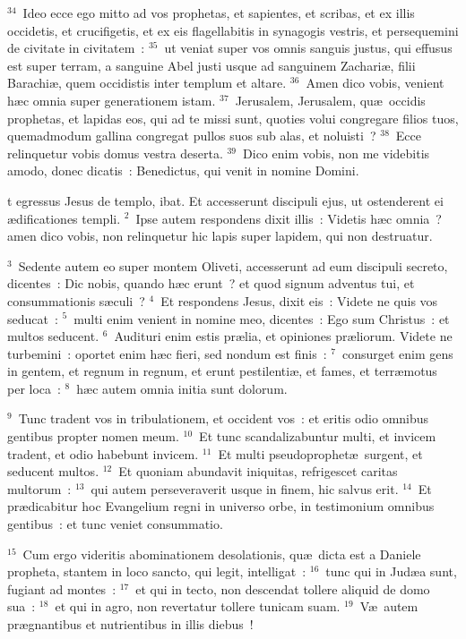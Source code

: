 ${}^{34}$~Ideo ecce ego mitto ad vos prophetas, et sapientes, et scribas, et ex illis occidetis, et crucifigetis, et ex eis flagellabitis in synagogis vestris, et persequemini de civitate in civitatem~:
${}^{35}$~ut veniat super vos omnis sanguis justus, qui effusus est super terram, a sanguine Abel justi usque ad sanguinem Zachari\ae , filii Barachi\ae , quem occidistis inter templum et altare.
${}^{36}$~Amen dico vobis, venient h\ae c omnia super generationem istam.
${}^{37}$~Jerusalem, Jerusalem, qu\ae\ occidis prophetas, et lapidas eos, qui ad te missi sunt, quoties volui congregare filios tuos, quemadmodum gallina congregat pullos suos sub alas, et noluisti~?
${}^{38}$~Ecce relinquetur vobis domus vestra deserta.
${}^{39}$~Dico enim vobis, non me videbitis amodo, donec dicatis~: Benedictus, qui venit in nomine Domini.

\bchapter
{}t egressus Jesus de templo, ibat. Et accesserunt discipuli ejus, ut ostenderent ei \ae dificationes templi.
${}^{2}$~Ipse autem respondens dixit illis~: Videtis h\ae c omnia~? amen dico vobis, non relinquetur hic lapis super lapidem, qui non destruatur.


${}^{3}$~Sedente autem eo super montem Oliveti, accesserunt ad eum discipuli secreto, dicentes~: Dic nobis, quando h\ae c erunt~? et quod signum adventus tui, et consummationis s\ae culi~?
${}^{4}$~Et respondens Jesus, dixit eis~: Videte ne quis vos seducat~:
${}^{5}$~multi enim venient in nomine meo, dicentes~: Ego sum Christus~: et multos seducent.
${}^{6}$~Audituri enim estis pr\ae lia, et opiniones pr\ae liorum. Videte ne turbemini~: oportet enim h\ae c fieri, sed nondum est finis~:
${}^{7}$~consurget enim gens in gentem, et regnum in regnum, et erunt pestilenti\ae , et fames, et terr\ae motus per loca~:
${}^{8}$~h\ae c autem omnia initia sunt dolorum.


${}^{9}$~Tunc tradent vos in tribulationem, et occident vos~: et eritis odio omnibus gentibus propter nomen meum.
${}^{10}$~Et tunc scandalizabuntur multi, et invicem tradent, et odio habebunt invicem.
${}^{11}$~Et multi pseudoprophet\ae\ surgent, et seducent multos.
${}^{12}$~Et quoniam abundavit iniquitas, refrigescet caritas multorum~:
${}^{13}$~qui autem perseveraverit usque in finem, hic salvus erit.
${}^{14}$~Et pr\ae dicabitur hoc Evangelium regni in universo orbe, in testimonium omnibus gentibus~: et tunc veniet consummatio.


${}^{15}$~Cum ergo videritis abominationem desolationis, qu\ae\ dicta est a Daniele propheta, stantem in loco sancto, qui legit, intelligat~:
${}^{16}$~tunc qui in Jud\ae a sunt, fugiant ad montes~:
${}^{17}$~et qui in tecto, non descendat tollere aliquid de domo sua~:
${}^{18}$~et qui in agro, non revertatur tollere tunicam suam.
${}^{19}$~V\ae\ autem pr\ae gnantibus et nutrientibus in illis diebus~!


